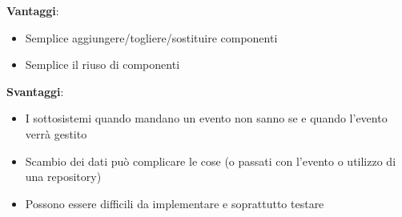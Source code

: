 \noindent \textbf{Vantaggi}:
\begin{itemize}
    \item Semplice aggiungere/togliere/sostituire componenti
    \item Semplice il riuso di componenti
\end{itemize}

\noindent \textbf{Svantaggi}:
\begin{itemize}
    \item I sottosistemi quando mandano un evento non sanno se e quando l’evento verrà gestito
    \item Scambio dei dati può complicare le cose (o passati con l'evento o utilizzo di una repository)
    \item Possono essere difficili da implementare e soprattutto testare
\end{itemize}